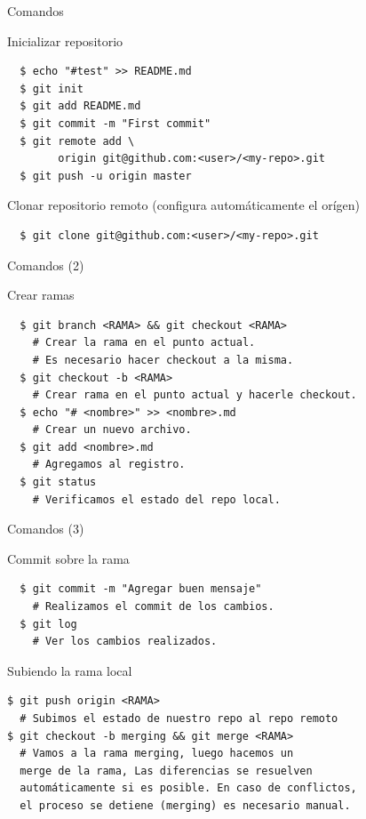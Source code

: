 \documentclass{beamer}
\begin{document}
\begin{frame}[fragile]{Comandos}
  \begin{block}{Inicializar repositorio}
    \begin{verbatim}
  $ echo "#test" >> README.md
  $ git init
  $ git add README.md
  $ git commit -m "First commit"
  $ git remote add \
  		origin git@github.com:<user>/<my-repo>.git
  $ git push -u origin master
    \end{verbatim}
  \end{block} \pause
  
  \begin{block}{Clonar repositorio remoto (configura automáticamente el orígen)}
    \begin{verbatim}
  $ git clone git@github.com:<user>/<my-repo>.git
    \end{verbatim}
  \end{block}
  
\end{frame}

\begin{frame}[fragile]{Comandos (2)}
  \begin{block}{Crear ramas}
    \begin{verbatim}
  $ git branch <RAMA> && git checkout <RAMA>
    # Crear la rama en el punto actual.                 
    # Es necesario hacer checkout a la misma.
  $ git checkout -b <RAMA>  
    # Crear rama en el punto actual y hacerle checkout.
  $ echo "# <nombre>" >> <nombre>.md
    # Crear un nuevo archivo.
  $ git add <nombre>.md
    # Agregamos al registro.
  $ git status
    # Verificamos el estado del repo local.
    \end{verbatim}
  \end{block}
\end{frame}

\begin{frame}[fragile]{Comandos (3)}
  \begin{block}{Commit sobre la rama}
    \begin{verbatim}
  $ git commit -m "Agregar buen mensaje"
    # Realizamos el commit de los cambios.
  $ git log
    # Ver los cambios realizados.
    \end{verbatim}
  \end{block} \pause
  
  \begin{block}{Subiendo la rama local}
    \begin{verbatim}
$ git push origin <RAMA>
  # Subimos el estado de nuestro repo al repo remoto
$ git checkout -b merging && git merge <RAMA>
  # Vamos a la rama merging, luego hacemos un 
  merge de la rama, Las diferencias se resuelven 
  automáticamente si es posible. En caso de conflictos,
  el proceso se detiene (merging) es necesario manual.
  \end{verbatim}
  \end{block}
\end{frame}
\end{document}
